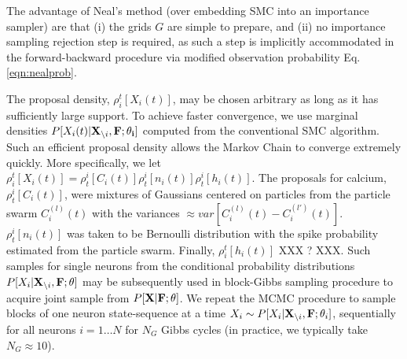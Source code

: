 The advantage of Neal's method (over embedding SMC into an importance sampler) are that (i) the grids $G$ are simple to prepare, and (ii) no importance sampling rejection step is required, as such a  step is implicitly accommodated in the forward-backward procedure via modified observation probability Eq. \eqref{eqn:nealprob}.

The proposal density, $\rho_i^t[X_i(t)]$, may be chosen arbitrary as long as it has sufficiently large support.  To achieve faster convergence, we use marginal densities $P[X_i(t)|{\bf X}_{\backslash i}, \bf F; \mathbf{\theta}_i]$ computed from the conventional SMC algorithm. Such an efficient proposal density allows the Markov Chain to converge extremely quickly.  More specifically, we let $\rho_i^t[X_i(t)] = \rho^i_t[C_i(t)] \rho^i_t[n_i(t)] \rho^i_t[h_i(t)].$  The proposals for calcium, $\rho^i_t[C_i(t)]$, were mixtures of Gaussians centered on particles from the particle swarm $C_i^{(l)}(t)$ with the variances $\approx var\left[C_i^{(l)}(t)-C_i^{(l')}(t) \right]$. $\rho^i_t[n_i(t)]$ was taken to be Bernoulli distribution with the spike probability estimated from the particle swarm. Finally, $\rho_i^t[h_i(t)]$ XXX ? XXX.  Such samples for single neurons from the conditional probability distributions $P[X_i|{\bf X}_{\backslash i}, \bf F; \theta]$ may be subsequently used in block-Gibbs sampling procedure to acquire joint sample from $P[{\bf X}| {\bf F}; \theta]$.  We repeat the MCMC procedure to sample blocks of one neuron state-sequence at a time $X_i\sim P[X_{i}|{\bf X}_{\backslash i},{\bf F}; \mathbf{\theta}_i]$, sequentially for all neurons $i=1\ldots N$ for $N_G$ Gibbs cycles (in practice, we typically take $N_G \approx 10$).

